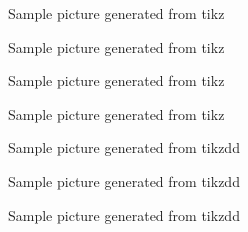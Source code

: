 \documentclass[
	12pt
] {article}
\begin{document}
	\newpage \begin{figure}[H]
		\centering
		\begin{subfigure}[b]{\textwidth}
			\centering
			
		\end{subfigure}
		\caption{Sample picture generated from tikz}
	\end{figure}


	\newpage \begin{figure}[H]
		\centering
		\begin{subfigure}[b]{\textwidth}
			\centering
			
		\end{subfigure}
		\caption{Sample picture generated from tikz}
	\end{figure}

	\newpage \begin{figure}[H]
		\centering
		\begin{subfigure}[b]{\textwidth}
			\centering
			
		\end{subfigure}
		\caption{Sample picture generated from tikz}
	\end{figure}

	\newpage \begin{figure}[H]
		\centering
		\begin{subfigure}[b]{\textwidth}
			\centering
			
		\end{subfigure}
		\caption{Sample picture generated from tikz}
	\end{figure}


	\newpage \begin{figure}[H]
		\centering
		\begin{subfigure}[b]{\textwidth}
			\centering
			
		\end{subfigure}
		\caption{Sample picture generated from tikzdd}
	\end{figure}

	\newpage \begin{figure}[H]
		\centering
		\begin{subfigure}[b]{\textwidth}
			\centering
			
		\end{subfigure}
		\caption{Sample picture generated from tikzdd}
	\end{figure}


	\newpage \begin{figure}[H]
		\centering
		\begin{subfigure}[b]{\textwidth}
			\centering
			
		\end{subfigure}
		\caption{Sample picture generated from tikzdd}
	\end{figure}
\end{document}
